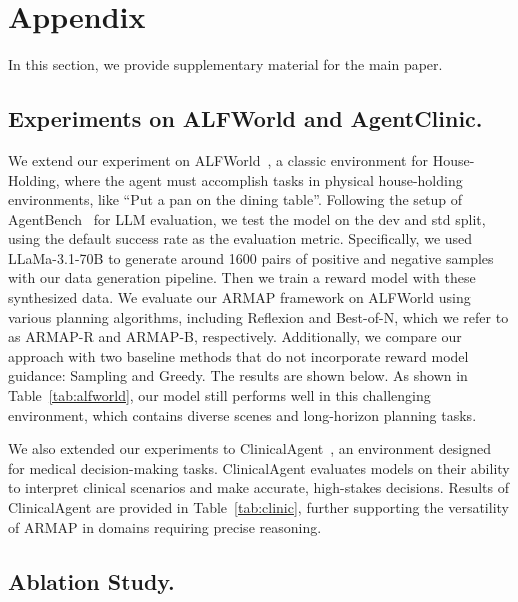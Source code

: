\section{Appendix}
In this section, we provide supplementary material for the main paper.
\subsection{Experiments on ALFWorld and AgentClinic.}
\label{sec:exprenv}
We extend our experiment on ALFWorld~\citep{ALFWorld20}, a classic environment for House-Holding, where the agent must accomplish tasks in physical house-holding environments, like “Put a pan on the dining table”. Following the setup of AgentBench~\citep{liu2023agentbench} for LLM evaluation, we test the model on the dev and std split, using the default success rate as the evaluation metric. 
Specifically, we used LLaMa-3.1-70B to generate around 1600 pairs of positive and negative samples with our data generation pipeline. Then we train a reward model with these synthesized data. We evaluate our ARMAP framework on ALFWorld using various planning algorithms, including Reflexion and Best-of-N, which we refer to as ARMAP-R and ARMAP-B, respectively. Additionally, we compare our approach with two baseline methods that do not incorporate reward model guidance: Sampling and Greedy. The results are shown below. As shown in Table~\ref{tab:alfworld}, our model still performs well in this challenging environment, which contains diverse scenes and long-horizon planning tasks.
 


We also extended our experiments to ClinicalAgent~\citep{schmidgall2024agentclinic}, an environment designed for medical decision-making tasks. ClinicalAgent evaluates models on their ability to interpret clinical scenarios and make accurate, high-stakes decisions. Results of ClinicalAgent are provided in Table~\ref{tab:clinic}, further supporting the versatility of ARMAP in domains requiring precise reasoning.
 

\subsection{Ablation Study.}
\label{sec:expabl}

